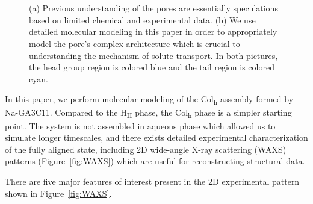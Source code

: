 \documentclass[journal=jpcbfk,manuscript=article]{achemso}
\begin{document}
\begin{figure}[!htb]
\begin{subfigure}{0.45\linewidth}
		\caption{}~\label{fig:detailed_pore}
	\end{subfigure}
    \caption{(a) Previous understanding of the pores are essentially speculations 
    based on limited chemical and experimental data. (b) We use detailed molecular 
    modeling in this paper in order to appropriately model the pore's complex architecture
    which is crucial to understanding the mechanism of solute transport. In both 
    pictures, the head group region is colored blue and the tail region is colored cyan.}~\label{fig:detail}
  \end{figure}
 
  In this paper, we perform molecular modeling of the Col\textsubscript{h}
  assembly formed by Na-GA3C11. Compared to the H\textsubscript{II} phase, the
  Col\textsubscript{h} phase is a simpler starting point. The system is not
  assembled in aqueous phase which allowed us to simulate longer timescales, and
  there exists detailed experimental characterization of the fully aligned state,
  including 2D wide-angle X-ray scattering (WAXS) patterns
  (Figure~\ref{fig:WAXS}) which are useful for reconstructing structural data. 
  
  
  There are five major features of interest present in the 2D experimental
  pattern shown in Figure~\ref{fig:WAXS}.
\end{document}
